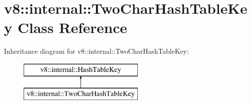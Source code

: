 \hypertarget{classv8_1_1internal_1_1_two_char_hash_table_key}{}\section{v8\+:\+:internal\+:\+:Two\+Char\+Hash\+Table\+Key Class Reference}
\label{classv8_1_1internal_1_1_two_char_hash_table_key}
Inheritance diagram for v8\+:\+:internal\+:\+:Two\+Char\+Hash\+Table\+Key\+:\begin{figure}[H]
\begin{center}
\leavevmode
\includegraphics[height=2.000000cm]{classv8_1_1internal_1_1_two_char_hash_table_key}
\end{center}
\end{figure}
